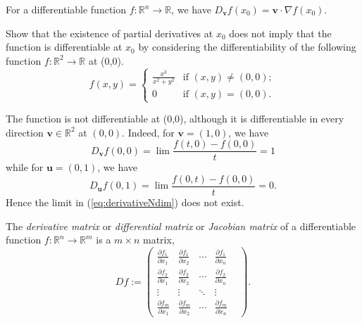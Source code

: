 \begin{coro}
  For a differentiable function
  $f: \mathbb{R}^n\rightarrow \mathbb{R}$,
  we have
  $D_{\mathbf{v}} f(x_0) = \mathbf{v}\cdot \nabla f(x_0)$.
\end{coro}

\begin{exc}
  Show that the existence of partial derivatives at $x_0$
  does not imply that the function is differentiable at $x_0$
  by considering the differentiability of
  the following function $f: \mathbb{R}^2\rightarrow \mathbb{R}$
  at (0,0). 
  \begin{displaymath}
    f(x,y) =
    \begin{cases}
      \frac{x^3}{x^2+y^2} & \text{if } (x,y)\ne (0,0);
      \\
      0 & \text{if } (x,y)= (0,0).
    \end{cases}
  \end{displaymath}
\end{exc}
\begin{solution}
The function is not differentiable at (0,0),
  although it is differentiable in every direction $\mathbf{v}\in
  \mathbb{R}^2$ at $(0,0)$.
  Indeed, for $\mathbf{v}=(1,0)$, we have
  \begin{displaymath}
    D_{\mathbf{v}} f (0,0) = \lim \frac{f(t,0)-f(0,0)}{t}
    = 1
  \end{displaymath}
  while for $\mathbf{u}=(0,1)$, we have
  \begin{displaymath}
    D_{\mathbf{u}} f (0,1) = \lim \frac{f(0,t)-f(0,0)}{t}
    = 0.
  \end{displaymath}
  Hence the limit in (\ref{eq:derivativeNdim}) does not exist.
\end{solution}

\begin{defn}
  The \emph{derivative matrix} or \emph{differential matrix}
  or \emph{Jacobian matrix} of a differentiable function
  \mbox{$f: \mathbb{R}^n\rightarrow\mathbb{R}^m$}
  is a $m\times n$ matrix,
  \begin{equation}
    \label{eq:JacobianMatrix}
    Df :=
    \begin{pmatrix}
      \frac{\partial f_1}{\partial x_1}
      &
      \frac{\partial f_1}{\partial x_2}
      & \cdots &
      \frac{\partial f_1}{\partial x_n}
      \\
      \frac{\partial f_2}{\partial x_1}
      &
      \frac{\partial f_2}{\partial x_2}
      & \cdots &
      \frac{\partial f_2}{\partial x_n}
      \\
      \vdots & \vdots & \ddots & \vdots &
      \\
      \frac{\partial f_m}{\partial x_1}
      &
      \frac{\partial f_m}{\partial x_2}
      & \cdots &
      \frac{\partial f_m}{\partial x_n}
    \end{pmatrix}.
  \end{equation}
\end{defn}

